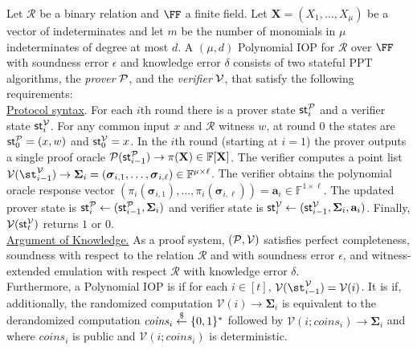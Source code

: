 \begin{definition} 
Let $\mathcal{R}$ be a binary relation and $\FF$ a finite field. Let $\mathbf{X} = (X_1, \ldots, X_\mu)$ be a vector of indeterminates and let $m$ be the number of monomials in $\mu$ indeterminates of degree at most $d$. A $(\mu, d)$ Polynomial IOP for $\mathcal{R}$ over $\FF$ with soundness error $\epsilon$ and knowledge error $\delta$ consists of two stateful PPT algorithms, the \emph{prover} $\mathcal{P}$, and the \emph{verifier} $\mathcal{V}$, that satisfy the following requirements:\\

\noindent \underline{Protocol syntax}. 
For each $i$th round there is a prover state $\textsf{st}^\mathcal{P}_i$ and a verifier state $\textsf{st}^\mathcal{V}_i$. For any common input $x$ and $\mathcal{R}$ witness $w$, at round 0 the states are $\textsf{st}^\mathcal{P}_0 = (x, w)$ and $\textsf{st}^\mathcal{V}_0 = x$. 
In the $i$th round (starting at $i = 1$) the prover outputs a single proof oracle $\mathcal{P}(\textsf{st}^\mathcal{P}_{i-1}) \rightarrow \pi(\mathbf{X}) \in \mathbb{F}[\mathbf{X}]$. The verifier computes a point list $\verifier(\st^\verifier_{i-1}) \rightarrow \boldsymbol{\Sigma}_i = (\boldsymbol{\sigma}_{i,1}, \ldots, \boldsymbol{\sigma}_{i, \ell}) \in \mathbb{F}^{\mu \times \ell}$. The verifier obtains the polynomial oracle response vector $(\pi_i(\boldsymbol{\sigma}_{i,1}), \ldots, \pi_i(\boldsymbol{\sigma}_{i, \ell})) = \mathbf{a}_i \in \mathbb{F}^{1 \times \ell}$. The updated prover state is $\textsf{st}^\mathcal{P}_i \leftarrow (\textsf{st}^\mathcal{P}_{i-1}, \boldsymbol{\Sigma}_i)$
and verifier state is $\textsf{st}^\mathcal{V}_i \leftarrow (\textsf{st}^\mathcal{V}_{i-1}, \boldsymbol{\Sigma}_i, \mathbf{a}_i)$. Finally, $\mathcal{V}(\textsf{st}^\mathcal{V}_t)$ returns $1$ or $0$. \\ 

\noindent \underline{Argument of Knowledge.} As a proof system, $(\mathcal{P}, \mathcal{V})$ satisfies perfect completeness, soundness with respect to the relation $\mathcal{R}$ and with soundness error $\epsilon$, and witness-extended emulation with respect $\mathcal{R}$ with knowledge error $\delta$. \\

Furthermore, a Polynomial IOP is  if for each $i \in [t]$, $\mathcal{V}(\st^\verifier_{i-1}) = \mathcal{V}(i)$. It is  if, additionally, the randomized computation $\mathcal{V}(i) \rightarrow \boldsymbol{\Sigma}_i$ is equivalent to the derandomized computation $\mathit{coins}_i \overset{\$}{\gets} \{0,1\}^*$ followed by $\mathcal{V}(i; \mathit{coins}_i) \rightarrow \boldsymbol{\Sigma}_i$ and where $\mathit{coins}_i$ is public and $\mathcal{V}(i; \mathit{coins}_i)$ is deterministic.
\end{definition}

